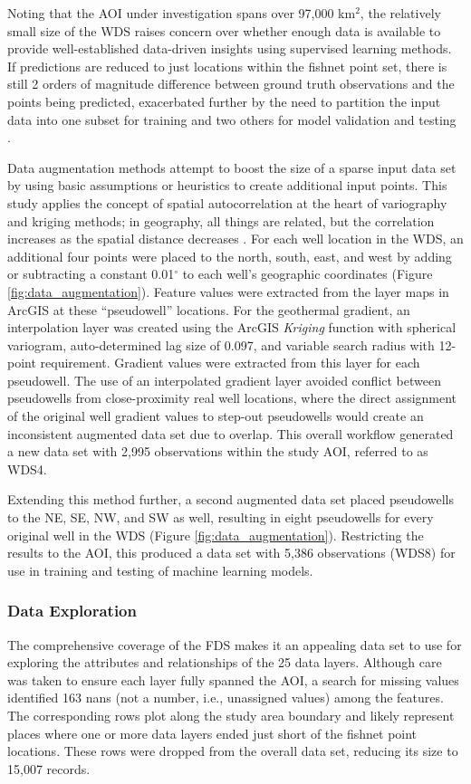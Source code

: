 Noting that the AOI under investigation spans over 97,000 km$^2$, the relatively small size of the WDS raises concern over whether enough data is available to provide well-established data-driven insights using supervised learning methods. If predictions are reduced to just locations within the fishnet point set, there is still 2 orders of magnitude difference between ground truth observations and the points being predicted, exacerbated further by the need to partition the input data into one subset for training and two others for model validation and testing \citep[e.g.,][~p. 222]{hastie_elements_2009}. 

Data augmentation methods attempt to boost the size of a sparse input data set by using basic assumptions or heuristics to create additional input points. This study applies the concept of spatial autocorrelation at the heart of variography and kriging methods; in geography, all things are related, but the correlation increases as the spatial distance decreases \citep[~chap. 13]{gimond_intro_2021}. For each well location in the WDS, an additional four points were placed to the north, south, east, and west by adding or subtracting a constant 0.01$^\circ$ to each well’s geographic coordinates (Figure \ref{fig:data_augmentation}). Feature values were extracted from the layer maps in ArcGIS at these “pseudowell” locations. For the geothermal gradient, an interpolation layer was created using the ArcGIS \textit{Kriging} function with spherical variogram, auto-determined lag size of 0.097, and variable search radius with 12-point requirement. Gradient values were extracted from this layer for each pseudowell. The use of an interpolated gradient layer avoided conflict between pseudowells from close-proximity real well locations, where the direct assignment of the original well gradient values to step-out pseudowells would create an inconsistent augmented data set due to overlap. This overall workflow generated a new data set with 2,995 observations within the study AOI, referred to as WDS4. 

Extending this method further, a second augmented data set placed pseudowells to the NE, SE, NW, and SW as well, resulting in eight pseudowells for every original well in the WDS (Figure \ref{fig:data_augmentation}). Restricting the results to the AOI, this produced a data set with 5,386 observations (WDS8) for use in training and testing of machine learning models.

\subsubsection{Data Exploration}
The comprehensive coverage of the FDS makes it an appealing data set to use for exploring the attributes and relationships of the 25 data layers. Although care was taken to ensure each layer fully spanned the AOI, a search for missing values identified 163 \acrshort{nan}s (not a number, i.e., unassigned values) among the features. The corresponding rows plot along the study area boundary and likely represent places where one or more data layers ended just short of the fishnet point locations. These rows were dropped from the overall data set, reducing its size to 15,007 records.

